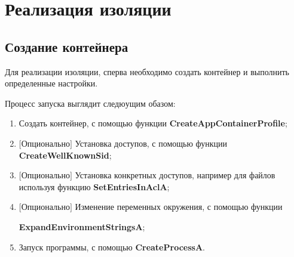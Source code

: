 \section{Реализация изоляции}
\subsection{Создание контейнера}
Для реализации изоляции, сперва необходимо создать контейнер и выполнить определенные настройки.

Процесс запуска выглядит следюущим обазом:
\begin{enumerate}
\item Создать контейнер, с помощью функции \textbf{CreateAppContainerProfile};
\item $[$Опционально$]$ Установка доступов, с помощью функции \textbf{CreateWellKnownSid};
\item $[$Опционально$]$ Установка конкретных доступов, например для файлов используя функцию \textbf{SetEntriesInAclA};
\item $[$Опционально$]$ Изменение переменных окружения, с помощью функции

\textbf{ExpandEnvironmentStringsA};
\item Запуск программы, с помощью \textbf{CreateProcessA}.
\end{enumerate}

